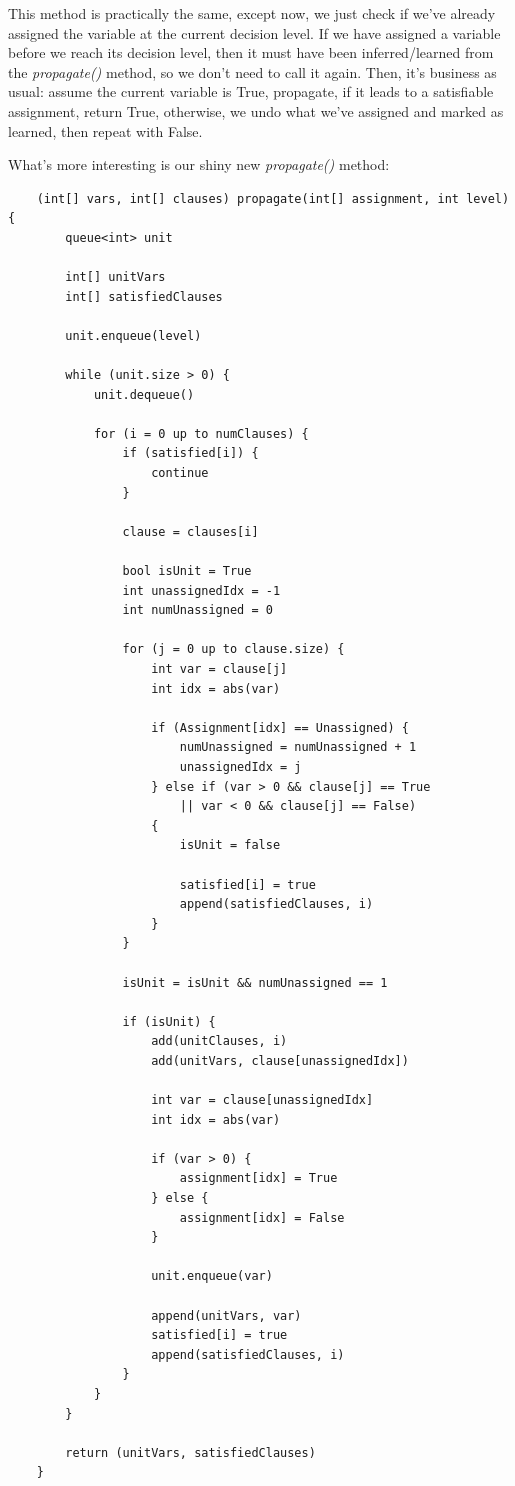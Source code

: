 \documentclass[oneside]{book}
\begin{document}
This method is practically the same, except now, we just check if we've already assigned 
the variable at the current decision level. If we have assigned a variable before we reach 
its decision level, then it must have been inferred/learned from the \textit{propagate()} 
method, so we don't need to call it again. Then, it's business as usual: assume the 
current variable is True, propagate, if it leads to a satisfiable assignment, return True, 
otherwise, we undo what we've assigned and marked as learned, then repeat with False. 

What's more interesting is our shiny new \textit{propagate()} method:

\begin{lstlisting}
    (int[] vars, int[] clauses) propagate(int[] assignment, int level) {
        queue<int> unit

        int[] unitVars
        int[] satisfiedClauses 

        unit.enqueue(level)

        while (unit.size > 0) {
            unit.dequeue()

            for (i = 0 up to numClauses) {
                if (satisfied[i]) {
                    continue
                }

                clause = clauses[i]

                bool isUnit = True
                int unassignedIdx = -1
                int numUnassigned = 0

                for (j = 0 up to clause.size) {
                    int var = clause[j]
                    int idx = abs(var)

                    if (Assignment[idx] == Unassigned) {
                        numUnassigned = numUnassigned + 1
                        unassignedIdx = j
                    } else if (var > 0 && clause[j] == True 
                        || var < 0 && clause[j] == False)
                    {
                        isUnit = false

                        satisfied[i] = true
                        append(satisfiedClauses, i)
                    }
                }

                isUnit = isUnit && numUnassigned == 1

                if (isUnit) {
                    add(unitClauses, i)
                    add(unitVars, clause[unassignedIdx])

                    int var = clause[unassignedIdx]
                    int idx = abs(var)

                    if (var > 0) {
                        assignment[idx] = True
                    } else {
                        assignment[idx] = False
                    }

                    unit.enqueue(var)

                    append(unitVars, var)
                    satisfied[i] = true
                    append(satisfiedClauses, i)
                }
            }
        }

        return (unitVars, satisfiedClauses)
    }
\end{lstlisting}
\end{document}
